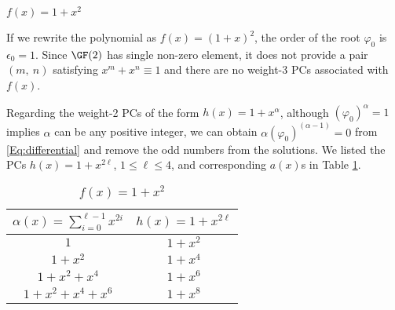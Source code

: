 \begin{example}
	$f(x)=1+x^2$\newline
	
	If we rewrite the polynomial as $f(x)=(1+x)^2$,	the order of the root $\varphi_0$ is $\epsilon_0=1$. Since $\GF(2)$ has single non-zero element, it does not provide a pair $(m,~n)$ satisfying $x^m+x^n \equiv 1$ and there are no weight-3 PCs associated with $f(x)$.
	
	Regarding the weight-2 PCs of the form $h(x)=1+x^\alpha$, although $(\varphi_0)^{\alpha} = 1$ implies $\alpha$ can be any positive integer, we can obtain $\alpha(\varphi_0)^{(\alpha-1)} = 0$ from \eqref{Eq:differential} and remove the odd numbers from the solutions. We listed the PCs $h(x)=1+x^{2\ell}$, $1 \leq \ell \leq 4$, and corresponding $a(x)$s in Table \ref{novelTab1}.
	\begin{table}[htbp]
		\renewcommand{\arraystretch}{1.3}
		\caption{$f(x)=1+x^2$}
		\centering
		\begin{tabular}{c c } 
			\toprule
			$\alpha(x)=\sum_{i=0}^{\ell-1} x^{2i}$ & $h(x)=1+x^{2\ell}$ \\ [0.5ex] 
			\midrule
			$1$ & $1+x^2$\\ 
			\hline
			$1+x^2$ & $1+x^4$ \\
			\hline
			$1+x^2+x^4$ & $1+x^6$\\
			\hline
			$1+x^2+x^4+x^6$ & $1+x^8$\\
			\bottomrule 
		\end{tabular}
		\label{novelTab1}
	\end{table}
\label{ex-3}
\end{example}


